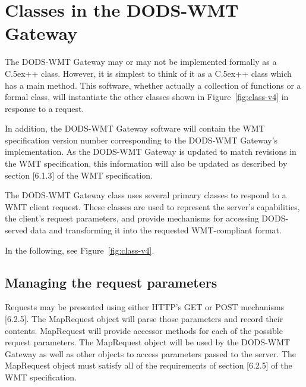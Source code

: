 \documentclass{article}
\newcommand{\Cpp}{{\rm {\small C}\raise.5ex\hbox{\footnotesize ++}}\xspace}
\begin{document}
\section{Classes in the DODS-WMT Gateway}
\label{sec:gateway}

\begin{sidewaysfigure}
\begin{center}
\caption{A Class diagram for the DODS-WMT Gateway. This diagram specifies the
classes and their interfaces, not the absolute implementation.}
\label{fig:class-v4}
\end{center}
\end{sidewaysfigure}

The DODS-WMT Gateway may or may not be implemented formally as a \Cpp class.
However, it is simplest to think of it as a \Cpp class which has a main
method. This software, whether actually a collection of functions or a formal
class, will instantiate the other classes shown in Figure~\ref{fig:class-v4}
in response to a request.

In addition, the DODS-WMT Gateway software will contain the WMT specification
version number corresponding to the DODS-WMT Gateway's implementation. As the
DODS-WMT Gateway is updated to match revisions in the WMT specification, this
information will also be updated as described by section [6.1.3] of the WMT
specification. 

The DODS-WMT Gateway class uses several primary classes to respond to
a WMT client request.  These classes are used to represent the server's
capabilities, the client's request parameters, and provide mechanisms
for accessing DODS-served data and transforming it into the requested
WMT-compliant format.

In the following, see Figure~\ref{fig:class-v4}.

\subsection{Managing the request parameters}
\label{sec:request}
Requests may be presented using either HTTP's GET or POST mechanisms [6.2.5].
The MapRequest object will parse those parameters and record their contents.
MapRequest will provide accessor methods for each of the possible request
parameters. The MapRequest object will be used by the DODS-WMT Gateway as well
as other objects to access parameters passed to the server. The MapRequest
object must satisfy all of the requirements of section [6.2.5] of the WMT
specification.
\end{document}
